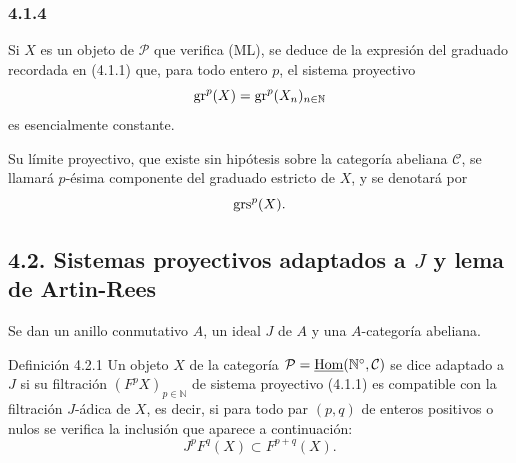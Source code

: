 \subsubsection*{4.1.4}
Si $X$ es un objeto de \(\mathcal P\) que verifica (ML), se deduce de la expresión del graduado recordada en (4.1.1) que, para todo entero \(p\), el sistema proyectivo
\[
\operatorname{gr}^p(X)=\operatorname{gr}^p(X_n)_{n\in\mathbb N}
\]
es esencialmente constante.

Su límite proyectivo, que existe sin hipótesis sobre la categoría abeliana \(\mathcal C\), se llamará \(p\)-ésima componente del graduado estricto de \(X\), y se denotará por
\[
\operatorname{grs}^p(X).
\]

\subsection*{4.2. Sistemas proyectivos adaptados a \(J\) y lema de Artin-Rees}

Se dan un anillo conmutativo \(A\), un ideal \(J\) de \(A\) y una \(A\)-categoría abeliana.

\begin{statement}{Definición 4.2.1}
Un objeto \(X\) de la categoría \(\mathcal P=\underline{\operatorname{Hom}}(\mathbb N^\circ,\mathcal C)\) se dice adaptado a \(J\) si su filtración \((F^pX)_{p\in\mathbb N}\) de sistema proyectivo (4.1.1) es compatible con la filtración \(J\)-ádica de \(X\), es decir, si para todo par \((p,q)\) de enteros positivos o nulos se verifica la inclusión que aparece a continuación:
\[
J^pF^q(X)\subset F^{p+q}(X).
\]
\end{statement}
